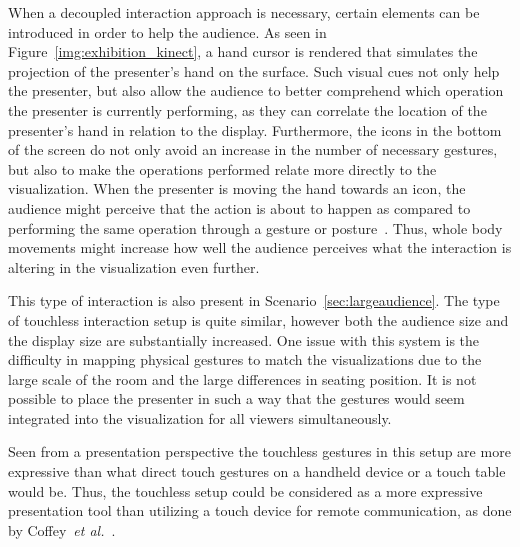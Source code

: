 \documentclass[review,journal]{vgtc}         %
\newcommand{\todo}[1]{\textbf{\textcolor{red}{[TODO: {#1}]}}}
\begin{document}
When a decoupled interaction approach is necessary, certain elements can be introduced in order to help the audience.
As seen in Figure~\ref{img:exhibition_kinect}, a hand cursor is rendered that simulates the projection of the presenter's hand on the surface.
Such visual cues not only help the presenter, but also allow the audience to better comprehend which operation the presenter is currently performing, as they can correlate the location of the presenter's hand in relation to the display.
Furthermore, the icons in the bottom of the screen do not only avoid an increase in the number of necessary gestures, but also to make the operations performed relate more directly to the visualization. 
When the presenter is moving the hand towards an icon, the audience might perceive that the action is about to happen as compared to performing the same operation through a gesture or posture~\cite{isenberg:hal-00781237}. 
Thus, whole body movements \cite{978-0-85729-432-6, Shoemaker:2010:BIT:1868914.1868967} might increase how well the audience perceives what the interaction is altering in the visualization even further.

This type of interaction is also present in Scenario~\ref{sec:largeaudience}. The type of touchless interaction setup is quite similar, however both the audience size and the display size are substantially increased.
One issue with this system is the difficulty in mapping physical gestures to match the visualizations due to the large scale of the room and the large differences in seating position.
It is not possible to place the presenter in such a way that the gestures would seem integrated into the visualization for all viewers simultaneously.

Seen from a presentation perspective the touchless gestures in this setup are more expressive than what direct touch gestures on a handheld device or a touch table would be.
Thus, the touchless setup could be considered as a more expressive presentation tool than utilizing a touch device for remote communication, as done by Coffey~\textit{et al.}~\cite{Coffey:2012:ISW:2360744.2360843}.




\end{document}
